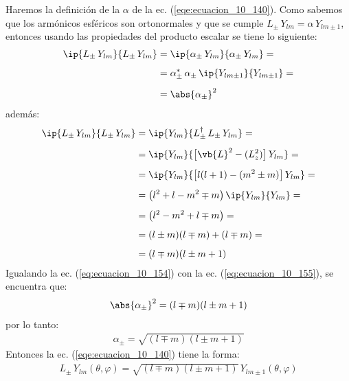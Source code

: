 Haremos la definición de la $\alpha$ de la ec. (\ref{eqe:ecuacion_10_140}). Como sabemos que los armónicos esféricos son ortonormales y que se cumple $L_{\pm} \, Y_{l m} = \alpha \, Y_{l m \pm 1}$, entonces usando las propiedades del producto escalar se tiene lo siguiente:
\begin{align}
\begin{aligned}[b]
\ip{L_{\pm} \, Y_{l m}}{L_{\pm} \, Y_{l m}} &= \ip{\alpha_{\pm} \, Y_{l m}}{\alpha_{\pm} \, Y_{l m}} =  \\[0.5em]
&= \alpha_{\pm}^{*} \, \alpha_{\pm} \, \ip{Y_{l m \pm 1}}{Y_{l m \pm 1}} = \\[0.5em]
&= \abs{\alpha_{\pm}}^{2}
\end{aligned}
\label{eq:ecuacion_10_154}
\end{align}
además:
\begin{align}
\begin{aligned}[b]
\ip{L_{\pm} \, Y_{l m}}{L_{\pm} \, Y_{l m}} &= \ip{Y_{l m}}{L_{\pm}^{\dagger} \, L_{\pm} \, Y_{l m}} = \\[0.5em]
&= \ip{Y_{l m}}{\big[ \vb{L}^{2} - (L_{z}^{2}) \big] \, Y_{ l m}} = \\[0.5em]
&= \ip{Y_{l m}}{ \big[ l (l + 1) - (m^{2} \pm m) \big] \, Y_{l m}} = \\[0.5em]
&= \big( l^{2} + l - m ^{2} \mp m \big) \, \ip{Y_{l m}}{Y_{l m}} = \\[0.5em]
&= \big( l^{2} - m ^{2} + l \mp m \big) = \\[0.5em]
&= ( l \pm m)(l \mp m) + (l \mp m) = \\[0.5em]
&= (l \mp m)(l \pm m + 1)
\end{aligned}
\label{eq:ecuacion_10_155}
\end{align}
Igualando la ec. (\ref{eq:ecuacion_10_154}) con la ec. (\ref{eq:ecuacion_10_155}), se encuentra que:
\begin{align}
\abs{\alpha_{\pm}}^{2} = (l \mp m)(l \pm m + 1)
\label{eq:ecuacion_10_156}
\end{align}
por lo tanto:
\begin{align}
\alpha_{\pm} = \sqrt{(l \mp m)(l \pm m + 1)}
\label{eq:ecuacion_10_157}
\end{align}
Entonces la ec. (\ref{eqe:ecuacion_10_140}) tiene la forma:
\begin{align}
L_{\pm} \, Y_{l m} (\theta, \varphi) = \sqrt{(l \mp m)(l \pm m + 1)} \, Y_{l m \pm 1} (\theta, \varphi)
\label{eq:ecuacion_10_158}
\end{align}

